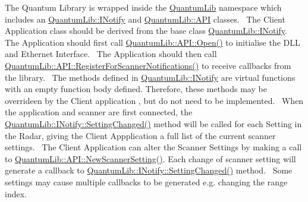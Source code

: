 The Quantum Library is wrapped inside the \mbox{\hyperlink{namespace_quantum_lib}{Quantum\+Lib}} namespace which includes an \mbox{\hyperlink{class_quantum_lib_1_1_i_notify}{Quantum\+Lib\+::\+I\+Notify}} and \mbox{\hyperlink{class_quantum_lib_1_1_a_p_i}{Quantum\+Lib\+::\+A\+PI}} classes.~\newline
The Client Application class should be derived from the base class \mbox{\hyperlink{class_quantum_lib_1_1_i_notify}{Quantum\+Lib\+::\+I\+Notify}}.~\newline
The Application should first call \mbox{\hyperlink{class_quantum_lib_1_1_a_p_i_a6be3553bb420e8f804d1ea652273cc99}{Quantum\+Lib\+::\+A\+P\+I\+::\+Open()}} to initialise the D\+LL and Ethernet Interface.~\newline
The Application should then call \mbox{\hyperlink{class_quantum_lib_1_1_a_p_i_ad63c6415fc479338caecd97f05c06b02}{Quantum\+Lib\+::\+A\+P\+I\+::\+Register\+For\+Scanner\+Notifications()}} to receive callbacks from the library.~\newline
The methods defined in \mbox{\hyperlink{class_quantum_lib_1_1_i_notify}{Quantum\+Lib\+::\+I\+Notify}} are virtual functions with an empty function body defined. Therefore, these methods may be overrideen by the Client application , but do not need to be implemented.~\newline
When the application and scanner are first connected, the \mbox{\hyperlink{class_quantum_lib_1_1_i_notify_aa7224861ce088af10d5b471d9550bb21}{Quantum\+Lib\+::\+I\+Notify\+::\+Setting\+Changed()}} method will be called for each Setting in the Radar, giving the Client Appplication a full list of the current scanner settings.~\newline
The Client Application can alter the Scanner Settings by making a call to \mbox{\hyperlink{class_quantum_lib_1_1_a_p_i_a9102a0ac0ca44b4d4f7a677e48b3d277}{Quantum\+Lib\+::\+A\+P\+I\+::\+New\+Scanner\+Setting()}}. Each change of scanner setting will generate a callback to \mbox{\hyperlink{class_quantum_lib_1_1_i_notify_aa7224861ce088af10d5b471d9550bb21}{Quantum\+Lib\+::\+I\+Notify\+::\+Setting\+Changed()}} method.~\newline
Some settings may cause multiple callbacks to be generated e.\+g. changing the range index.~\newline
